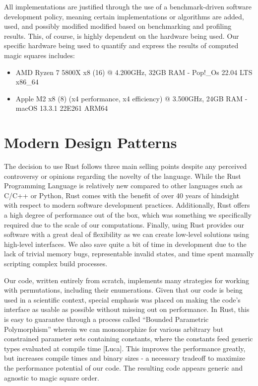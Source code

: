 \documentclass[12pt]{report}
\begin{document}
\par All implementations are justified through the use of a benchmark-driven software development
policy, meaning certain implementations or algorithms are added, used, and possibly modified
modified based on benchmarking and profiling results. This, of course, is highly dependent on the
hardware being used. Our specific hardware being used to quantify and express the results of
computed magic squares includes:

\begin{itemize}
  \item AMD Ryzen 7 5800X x8 (16) @ 4.200GHz, 32GB RAM \hyphen{}  Pop!\_Os 22.04 LTS x86\_64
  \item Apple M2 x8 (8) (x4 performance, x4 efficiency) @ 3.500GHz, 24GB RAM \hyphen{} macOS 13.3.1
        22E261 ARM64
\end{itemize}

\section{Modern Design Patterns}

\par The decision to use Rust follows three main selling points despite any perceived controversy
or opinions regarding the novelty of the language. While the Rust Programming Language is
relatively new compared to other languages such as C/C++ or Python, Rust comes with the benefit of
over 40 years of hindsight with respect to modern software development practices. Additionally,
Rust offers a high degree of performance out of the box, which was something we specifically
required due to the scale of our computations. Finally, using Rust provides our software with a
great deal of flexibility as we can create low-level solutions using high-level interfaces. We also
save quite a bit of time in development due to the lack of trivial memory bugs, representable
invalid states, and time spent manually scripting complex build processes.

\par Our code, written entirely from scratch, implements many strategies for working with
permutations, including their enumerations. Given that our code is being used in a scientific
context, special emphasis was placed on making the code's interface as usable as possible without
missing out on performance. In Rust, this is easy to guarantee through a process called ``Bounded
Parametric Polymorphism'' wherein we can monomorphize for various arbitrary but constrained
parameter sets containing constants, where the constants feed generic types evaluated at compile
time [Luca]. This improves the performance greatly, but increases compile times and binary sizes
\hyphen{} a necessary tradeoff to maximize the performance potential of our code. The resulting
code appears generic and agnostic to magic square order.
\end{document}
